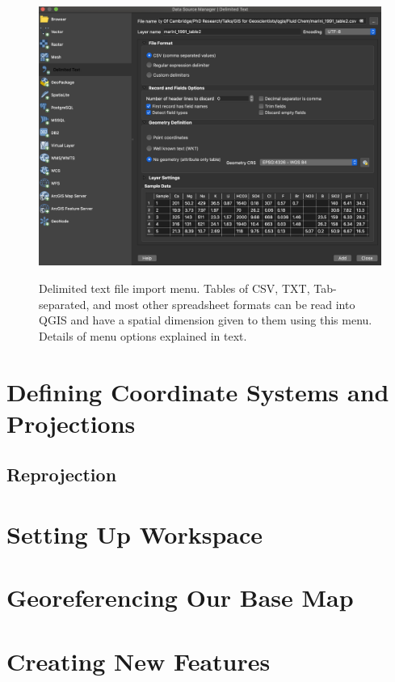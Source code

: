 \documentclass{article}
\begin{document}
\begin{figure}[htbp]
    \centering
    \includegraphics[width=\textwidth]{Fig_13_CSV_example.png}
    \label{fig13}
    \caption{Delimited text file import menu. Tables of CSV, TXT, Tab-separated, and most other spreadsheet formats can be read into QGIS and have a spatial dimension given to them using this menu. Details of menu options explained in text.}
\end{figure}

\section{Defining Coordinate Systems and Projections}

\subsection{Reprojection}

\section{Setting Up Workspace}

\section{Georeferencing Our Base Map}

\section{Creating New Features}
\end{document}

